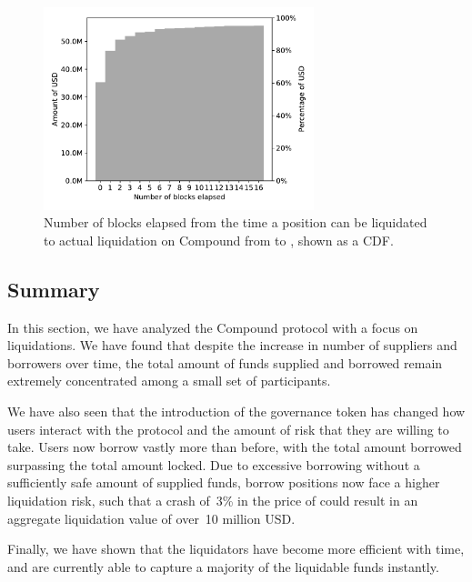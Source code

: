 \begin{figure}[tbp]
    \centering
    \includegraphics[width=0.7\textwidth]{./5b-economic-security/figures/time-to-liquidation.pdf}
    \caption{Number of blocks elapsed from the time a position can be liquidated to actual liquidation on Compound from \StartDate to \EndDate, shown as a CDF.}
    \label{fig:blocks-spent}
\end{figure}

\subsection{Summary}
In this section, we have analyzed the Compound protocol with a focus on liquidations.
We have found that despite the increase in number of suppliers and borrowers over time, the total amount of funds supplied and borrowed remain extremely concentrated among a small set of participants.

We have also seen that the introduction of the  governance token has changed how users interact with the protocol and the amount of risk that they are willing to take.
Users now borrow vastly more than before, with the total amount borrowed surpassing the total amount locked.
Due to excessive borrowing without a sufficiently safe amount of supplied funds, borrow positions now face a higher liquidation risk, such that a crash of~3\% in the price of  could result in an aggregate liquidation value of over~10 million USD.

Finally, we have shown that the liquidators have become more efficient with time, and are currently able to capture a majority of the liquidable funds instantly.
